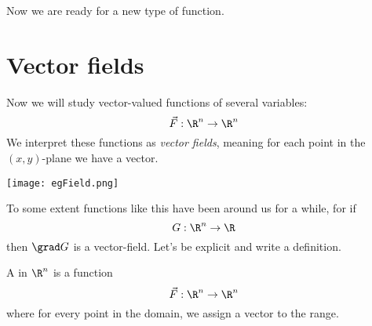 \documentclass{ximera}
\begin{document}
Now we are ready for a new type of function.

\section{Vector fields}


Now we will study vector-valued functions of several variables:
\[
\vec{F}:\R^n\to \R^n
\]
We interpret these functions as \textit{vector fields}, meaning for
each point in the $(x,y)$-plane we have a vector.
\begin{image}
  \texttt{[image: egField.png]}
\end{image}
To some extent functions like this have been around us for a while,
for if
\[
G:\R^n\to\R
\]
then $\grad G$ is a vector-field.  Let's be explicit and write a definition.
\begin{definition}
  A  in $\R^n$ is a function
  \[
  \vec{F}: \R^n\to\R^n
  \]
  where for every point in the domain, we assign a vector to the range. 
\end{definition}
\end{document}
